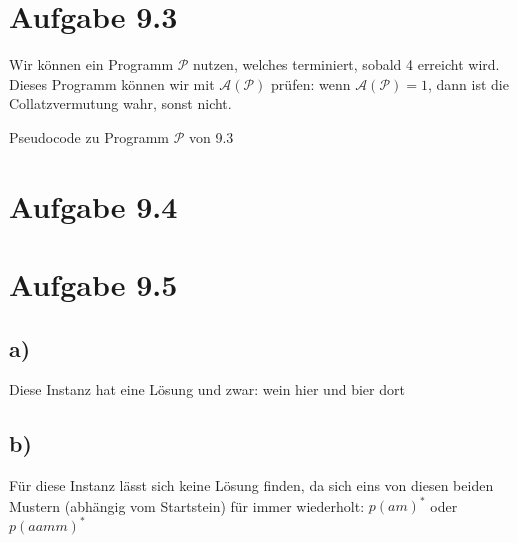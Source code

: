\documentclass{article}
\begin{document}
\section*{Aufgabe 9.3}
Wir können ein Programm $\mathcal{P}$ nutzen, welches terminiert, sobald 4 erreicht wird. Dieses Programm können wir mit $\mathcal{A}(\mathcal{P})$ prüfen: wenn $\mathcal{A}(\mathcal{P}) = 1$, dann ist die Collatzvermutung wahr, sonst nicht.
\begin{algorithm}[ht]
  \caption{Pseudocode zu Programm $\mathcal{P}$ von 9.3}
\end{algorithm}

\section*{Aufgabe 9.4}

\section*{Aufgabe 9.5}
\subsection*{a)}
Diese Instanz hat eine Lösung und zwar: wein hier und bier dort
\subsection*{b)}
Für diese Instanz lässt sich keine Lösung finden, da sich eins von diesen beiden Mustern (abhängig vom Startstein) für immer wiederholt: $p(am)^*$ oder $p(aamm)^*$
\end{document}
